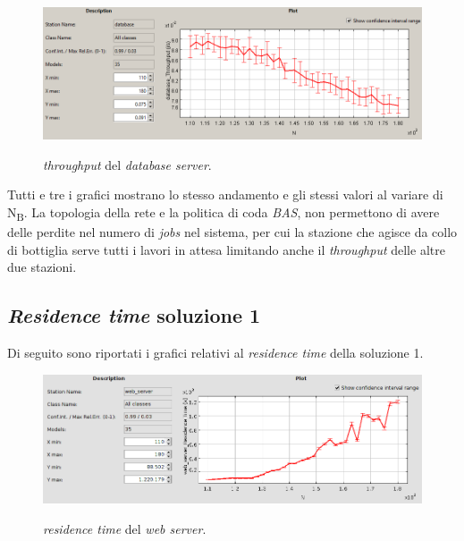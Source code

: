\documentclass[../main.tex]{subfiles}
\begin{document}
    \begin{figure}[H]
        \centering
        \includegraphics[scale = 0.6]{assets/db_th_1.PNG}\\
        \caption[\textit{Throughput} del \textit{database server}]{\textit{throughput} del \textit{database server}.}
        \label{fig:throughput-time-db}
    \end{figure}
    Tutti e tre i grafici mostrano lo stesso andamento e gli stessi valori al variare di N\textsubscript{B}.
    La topologia della rete e la politica di coda \textit{BAS}, non permettono di avere delle perdite nel numero di
    \textit{jobs} nel sistema, per cui la stazione che agisce da collo di bottiglia serve tutti i lavori in attesa
    limitando anche il \textit{throughput} delle altre due stazioni.

    \subsection{\textit{Residence time} soluzione 1}\label{subsec:residence-time-soluzione-1}
    Di seguito sono riportati i grafici relativi al \textit{residence time} della soluzione 1.
    \begin{figure}[H]
        \centering
        \includegraphics[scale = 0.45]{assets/ws_res_1.png}\\
        \caption[\textit{Residence time} del \textit{web server}]{\textit{residence time} del \textit{web server}.}
        \label{fig:residence-time-ws}
    \end{figure}
\end{document}
